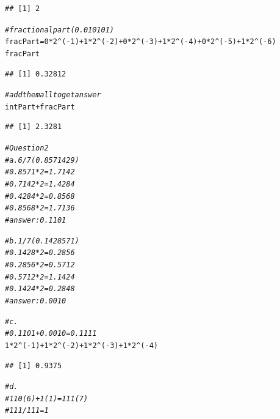 \documentclass{article}\usepackage[]{graphicx}\usepackage[]{xcolor}
\makeatletter
\newcommand{\hlnum}[1]{\textcolor[rgb]{0.686,0.059,0.569}{#1}}%
\newcommand{\hlcom}[1]{\textcolor[rgb]{0.678,0.584,0.686}{\textit{#1}}}%
\newcommand{\hlopt}[1]{\textcolor[rgb]{0,0,0}{#1}}%
\newcommand{\hlstd}[1]{\textcolor[rgb]{0.345,0.345,0.345}{#1}}%
\newcommand{\hlkwb}[1]{\textcolor[rgb]{0.69,0.353,0.396}{#1}}%
\newenvironment{kframe}{%
 \def\at@end@of@kframe{}%
 \ifinner\ifhmode%
  \def\at@end@of@kframe{\end{minipage}}%
  \begin{minipage}{\columnwidth}%
 \fi\fi%
 \def\FrameCommand##1{\hskip\@totalleftmargin \hskip-\fboxsep
 \colorbox{shadecolor}{##1}\hskip-\fboxsep
     \hskip-\linewidth \hskip-\@totalleftmargin \hskip\columnwidth}%
 \MakeFramed {\advance\hsize-\width
   \@totalleftmargin\z@ \linewidth\hsize
   \@setminipage}}%
 {\par\unskip\endMakeFramed%
 \at@end@of@kframe}
\newenvironment{knitrout}{}{} %
\makeatother
\begin{document}
\begin{knitrout}
\begin{kframe}
\begin{verbatim}
## [1] 2
\end{verbatim}
\begin{alltt}
\hlcom{# fractional part (0.010101)}
\hlstd{fracPart} \hlkwb{=} \hlnum{0}\hlopt{*}\hlnum{2}\hlopt{^}\hlstd{(}\hlopt{-}\hlnum{1}\hlstd{)} \hlopt{+} \hlnum{1}\hlopt{*}\hlnum{2}\hlopt{^}\hlstd{(}\hlopt{-}\hlnum{2}\hlstd{)} \hlopt{+} \hlnum{0}\hlopt{*}\hlnum{2}\hlopt{^}\hlstd{(}\hlopt{-}\hlnum{3}\hlstd{)} \hlopt{+} \hlnum{1}\hlopt{*}\hlnum{2}\hlopt{^}\hlstd{(}\hlopt{-}\hlnum{4}\hlstd{)} \hlopt{+} \hlnum{0}\hlopt{*}\hlnum{2}\hlopt{^}\hlstd{(}\hlopt{-}\hlnum{5}\hlstd{)} \hlopt{+} \hlnum{1}\hlopt{*}\hlnum{2}\hlopt{^}\hlstd{(}\hlopt{-}\hlnum{6}\hlstd{)}
\hlstd{fracPart}
\end{alltt}
\begin{verbatim}
## [1] 0.32812
\end{verbatim}
\begin{alltt}
\hlcom{# add them all to get answer}
\hlstd{intPart} \hlopt{+} \hlstd{fracPart}
\end{alltt}
\begin{verbatim}
## [1] 2.3281
\end{verbatim}
\begin{alltt}
\hlcom{# Question 2 }
\hlcom{# a. 6/7 (0.8571429)}
\hlcom{# 0.8571*2 = 1.7142}
\hlcom{# 0.7142*2 = 1.4284}
\hlcom{# 0.4284*2 = 0.8568}
\hlcom{# 0.8568*2 = 1.7136}
\hlcom{# answer: 0.1101}

\hlcom{# b. 1/7 (0.1428571)}
\hlcom{# 0.1428*2 = 0.2856}
\hlcom{# 0.2856*2 = 0.5712}
\hlcom{# 0.5712*2 = 1.1424}
\hlcom{# 0.1424*2 = 0.2848}
\hlcom{# answer: 0.0010}

\hlcom{# c. }
\hlcom{# 0.1101 + 0.0010 = 0.1111}
\hlnum{1}\hlopt{*}\hlnum{2}\hlopt{^}\hlstd{(}\hlopt{-}\hlnum{1}\hlstd{)} \hlopt{+} \hlnum{1}\hlopt{*}\hlnum{2}\hlopt{^}\hlstd{(}\hlopt{-}\hlnum{2}\hlstd{)} \hlopt{+} \hlnum{1}\hlopt{*}\hlnum{2}\hlopt{^}\hlstd{(}\hlopt{-}\hlnum{3}\hlstd{)} \hlopt{+} \hlnum{1}\hlopt{*}\hlnum{2}\hlopt{^}\hlstd{(}\hlopt{-}\hlnum{4}\hlstd{)}
\end{alltt}
\begin{verbatim}
## [1] 0.9375
\end{verbatim}
\begin{alltt}
\hlcom{# d.}
\hlcom{# 110 (6) +  1 (1) = 111 (7)}
\hlcom{# 111/111 = 1}



\end{alltt}
\end{kframe}
\end{knitrout}
\end{document}
